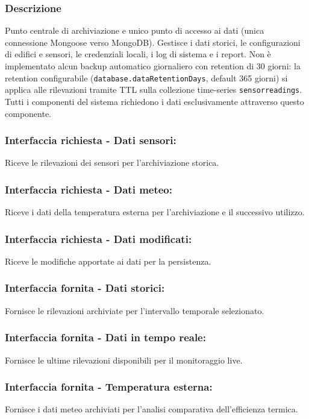        \subsubsection*{Descrizione} 
            Punto centrale di archiviazione e unico punto di accesso ai dati (unica connessione Mongoose verso MongoDB). Gestisce i dati storici, le configurazioni di edifici e sensori, le credenziali locali, i log di sistema e i report. Non \`e implementato alcun backup automatico giornaliero con retention di 30 giorni: la retention configurabile (\texttt{database.dataRetentionDays}, default 365 giorni) si applica alle rilevazioni tramite TTL sulla collezione time-series \texttt{sensorreadings}. Tutti i componenti del sistema richiedono i dati esclusivamente attraverso questo componente.
        \subsubsection*{Interfaccia richiesta - Dati sensori:}
            Riceve le rilevazioni dei sensori per l'archiviazione storica.
        \subsubsection*{Interfaccia richiesta - Dati meteo:}
            Riceve i dati della temperatura esterna per l'archiviazione e il successivo utilizzo.
        \subsubsection*{Interfaccia richiesta - Dati modificati:}
            Riceve le modifiche apportate ai dati per la persistenza.
        \subsubsection*{Interfaccia fornita - Dati storici:}
            Fornisce le rilevazioni archiviate per l'intervallo temporale selezionato.
        \subsubsection*{Interfaccia fornita - Dati in tempo reale:}
            Fornisce le ultime rilevazioni disponibili per il monitoraggio live.
        \subsubsection*{Interfaccia fornita - Temperatura esterna:}
            Fornisce i dati meteo archiviati per l'analisi comparativa dell'efficienza termica.
